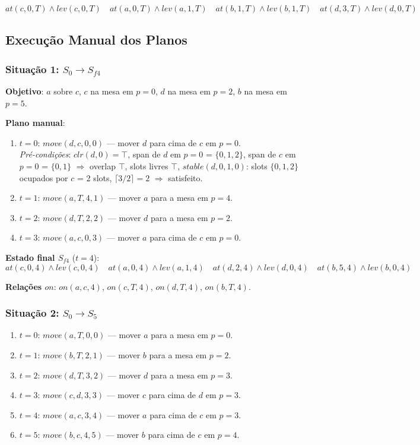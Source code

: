 \documentclass[12pt,a4paper]{article}
\begin{document}
\[
at(c,0,T) \wedge lev(c,0,T) \quad at(a,0,T) \wedge lev(a,1,T) \quad at(b,1,T) \wedge lev(b,1,T) \quad at(d,3,T) \wedge lev(d,0,T)
\]

\subsection{Execução Manual dos Planos}

\subsubsection{Situação 1: $S_0 \to S_{f4}$}

\textbf{Objetivo}: $a$ sobre $c$, $c$ na mesa em $p=0$, $d$ na mesa em $p=2$, $b$ na mesa em $p=5$.

\textbf{Plano manual}:
\begin{enumerate}[leftmargin=1.2cm]
    \item $t=0$: $move(d, c, 0, 0)$ — mover $d$ para cima de $c$ em $p=0$.\\
    \emph{Pré-condições}: $clr(d,0)=\top$, span de $d$ em $p=0$ = $\{0,1,2\}$, span de $c$ em $p=0$ = $\{0,1\}$ $\Rightarrow$ overlap $\top$, slots livres $\top$, $stable(d,0,1,0)$: slots $\{0,1,2\}$ ocupados por $c$ = 2 slots, $\lceil 3/2 \rceil = 2$ $\Rightarrow$ satisfeito.
    \item $t=1$: $move(a, T, 4, 1)$ — mover $a$ para a mesa em $p=4$.
    \item $t=2$: $move(d, T, 2, 2)$ — mover $d$ para a mesa em $p=2$.
    \item $t=3$: $move(a, c, 0, 3)$ — mover $a$ para cima de $c$ em $p=0$.
\end{enumerate}

\textbf{Estado final $S_{f4}$} ($t=4$):
\[
at(c,0,4) \wedge lev(c,0,4) \quad at(a,0,4) \wedge lev(a,1,4) \quad at(d,2,4) \wedge lev(d,0,4) \quad at(b,5,4) \wedge lev(b,0,4)
\]

\textbf{Relações $on$}: $on(a,c,4)$, $on(c,T,4)$, $on(d,T,4)$, $on(b,T,4)$. \checkmark

\subsubsection{Situação 2: $S_0 \to S_5$}

\begin{enumerate}[leftmargin=1.2cm]
    \item $t=0$: $move(a, T, 0, 0)$ — mover $a$ para a mesa em $p=0$.
    \item $t=1$: $move(b, T, 2, 1)$ — mover $b$ para a mesa em $p=2$.
    \item $t=2$: $move(d, T, 3, 2)$ — mover $d$ para a mesa em $p=3$.
    \item $t=3$: $move(c, d, 3, 3)$ — mover $c$ para cima de $d$ em $p=3$.
    \item $t=4$: $move(a, c, 3, 4)$ — mover $a$ para cima de $c$ em $p=3$.
    \item $t=5$: $move(b, c, 4, 5)$ — mover $b$ para cima de $c$ em $p=4$.
\end{enumerate}
\end{document}
